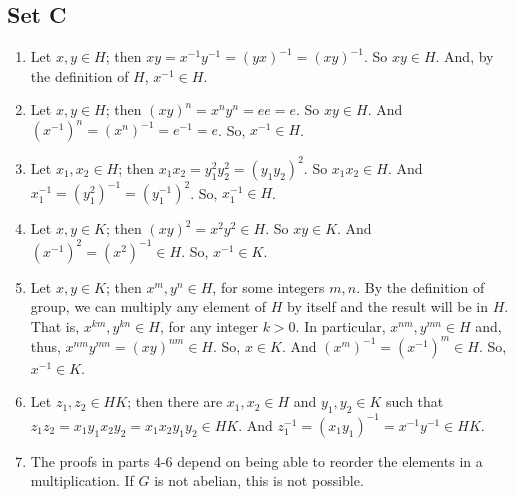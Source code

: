 \documentclass{article}
\begin{document}
\subsection{Set C}
\begin{enumerate}
    \item Let $x, y \in H$; then $xy = x^{-1}y^{-1} = (yx)^{-1} = (xy)^{-1}$. So $xy \in H$. And, by the definition of $H$, $x^{-1} \in H$.
    \item Let $x, y \in H$; then $(xy)^n = x^ny^n = ee = e$. So $xy \in H$. And $(x^{-1})^{n} = (x^n)^{-1} = e^{-1} = e$. So, $x^{-1} \in H$.
    \item Let $x_1, x_2 \in H$; then $x_1x_2 = y_1^2y_2^2 = (y_1y_2)^2$. So $x_1x_2 \in H$. And $x_1^{-1} = (y_1^2)^{-1} = (y_1^{-1})^{2}$. So, $x_1^{-1} \in H$.
    \item Let $x, y \in K$; then $(xy)^2 = x^2y^2 \in H$. So $xy \in K$. And $(x^{-1})^2 = (x^2)^{-1} \in H$. So, $x^{-1} \in K$.
    \item Let $x, y \in K$; then $x^m, y^n \in H$, for some integers $m, n$. By the definition of group, we can multiply any element of $H$ by itself and the result will be in $H$. That is, $x^{km}, y^{kn} \in H$, for any integer $k > 0$. In particular, $x^{nm}, y^{mn} \in H$ and, thus, $x^{nm}y^{mn} = (xy)^{nm} \in H$. So, $x \in K$. And $(x^m)^{-1} = (x^{-1})^m \in H$. So, $x^{-1} \in K$.
    \item Let $z_1, z_2 \in HK$; then there are $x_1, x_2 \in H$ and $y_1, y_2 \in K$ such that $z_1z_2 = x_1y_1x_2y_2 = x_1x_2y_1y_2 \in HK$. And $z_1^{-1} = (x_1y_1)^{-1} = x^{-1}y^{-1} \in HK$.
    \item The proofs in parts 4-6 depend on being able to reorder the elements in a multiplication. If $G$ is not abelian, this is not possible.
\end{enumerate}
\end{document}
